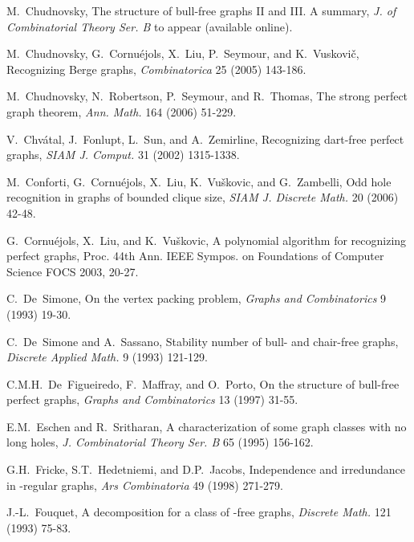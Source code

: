 \documentclass[11pt]{article}
\newcommand{\0}{\text{ has a co-join to }}
\newcommand{\1}{\text{ has a join to }}
\begin{document}
\begin{footnotesize}
\begin{thebibliography}{99}
    M.~Chudnovsky, 
    The structure of bull-free graphs II and III. A summary, 
    {\sl J. of Combinatorial Theory Ser. B} to appear (available online).

    M.~Chudnovsky, G.~Cornu\'ejols, X.~Liu, P.~Seymour, and K.~Vuskovi\v c,
    Recognizing Berge graphs, 
    {\sl Combinatorica} 25 (2005) 143-186.

    M.~Chudnovsky, N.~Robertson, P.~Seymour, and R.~Thomas,
    The strong perfect graph theorem, 
    {\sl Ann. Math.} 164 (2006) 51-229.

    V.~Chv\'atal, J.~Fonlupt, L.~Sun, and A.~Zemirline,
    Recognizing dart-free perfect graphs,
    {\sl SIAM J. Comput.} 31 (2002) 1315-1338.

    M.~Conforti, G.~Cornu\'ejols, X.~Liu, K.~Vu\v skovic, and G.~Zambelli,
    Odd hole recognition in graphs of bounded clique size,
    {\sl SIAM J. Discrete Math.} 20 (2006) 42-48.

    G.~Cornu\'ejols, X.~Liu, and K.~Vu\v skovic,
    A polynomial algorithm for recognizing perfect graphs,
    Proc. 44th Ann. IEEE Sympos. on Foundations of Computer Science FOCS 2003, 20-27.

    C.~De~Simone,
    On the vertex packing problem,
    {\sl Graphs and Combinatorics} 9 (1993) 19-30.

    C.~De~Simone and A.~Sassano,  
    Stability number of bull- and chair-free graphs,
    {\sl Discrete Applied Math.} 9 (1993) 121-129.

    C.M.H.~De~Figueiredo, F.~Maffray, and O.~Porto,
    On the structure of bull-free perfect graphs,
    {\sl Graphs and Combinatorics} 13 (1997) 31-55.

    E.M.~Eschen and R.~Sritharan,
    A characterization of some graph classes with no long holes,
    {\sl J. Combinatorial Theory Ser. B} 65 (1995) 156-162.

    G.H.~Fricke, S.T.~Hedetniemi, and D.P.~Jacobs,
    Independence and irredundance in -regular graphs,
    {\sl Ars Combinatoria} 49 (1998) 271-279.

    J.-L.~Fouquet,
    A decomposition for a class of -free graphs,
    {\sl Discrete Math.} 121 (1993) 75-83.





\end{thebibliography}
\end{footnotesize}
\end{document}
